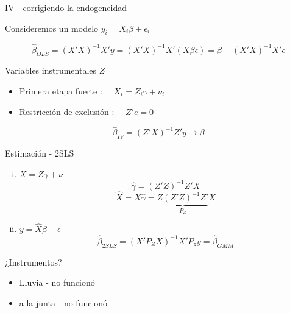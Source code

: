 \documentclass[8pt]{beamer}
\begin{document}
\begin{frame}{IV - corrigiendo la endogeneidad}

Consideremos un modelo $y_i = X_i\beta + \epsilon_i$

\[\hat\beta_{OLS} = (X'X)^{-1}X'y = (X'X)^{-1}X'(X\beta\epsilon) = \beta + (X'X)^{-1}X'\epsilon\]
\pause

\begin{block}{Variables instrumentales $Z$}
\begin{itemize}
    \item Primera etapa fuerte :  $ \quad X_i = Z_i\gamma+\nu_i$
    \item Restricción de exclusión : $\quad Z'e = 0$
\end{itemize}
\end{block}  

\pause
\[\hat\beta_{IV} = (Z'X)^{-1}Z'y\rightarrow \beta\]

\begin{block}{Estimación - 2SLS}
\begin{enumerate}[(i)]
    \item $X=Z\gamma+\nu$
    \[\hat\gamma = (Z'Z)^{-1}Z'X\]
    \[\hat X = X\hat\gamma = \underbrace{Z(Z'Z)^{-1}Z'}_{P_Z}X\]
    \item $y = \hat X\beta +\epsilon$
    \[\hat\beta_{2SLS} = (X'P_ZX)^{-1}X'P_zy= \hat\beta_{GMM}\]
\end{enumerate}
\end{block}
\end{frame}
\begin{frame}[label=inst]{¿Instrumentos?}
    \begin{itemize}
    \pause
        \item Lluvia \pause  - \color{red} no funcionó
    \pause
        \item \color{black}\hyperlink{dist}{} a la junta \pause  - \color{red} no funcionó
    \end{itemize}
\end{frame}
\end{document}
